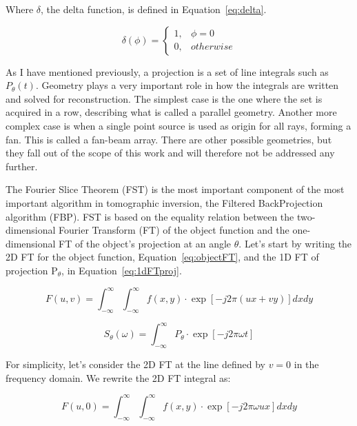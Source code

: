 Where $\delta$, the delta function, is defined in
Equation~\ref{eq:delta}.

\begin{equation}
    \label{eq:delta}
    \delta (\phi) =  
    \begin{cases}
            1, & \phi = 0\\
            0, & otherwise
    \end{cases}
\end{equation}

As I have mentioned previously, a projection is a set of line integrals
such as $P_{\theta}(t)$. Geometry plays a very important role in how the
integrals are written and solved for reconstruction. The simplest case
is the one where the set is acquired in a row, describing what is called
a parallel geometry. Another more complex case is when a single point
source is used as origin for all rays, forming a fan. This is called a
fan-beam array. There are other possible geometries, but they fall out of
the scope of this work and will therefore not be addressed any further.

The Fourier Slice Theorem (\gls{FST}) is the most important component of
the most important algorithm in tomographic inversion, the Filtered
BackProjection algorithm (\gls{FBP}). \gls{FST} is based on the equality
relation between the 
two-dimensional Fourier Transform (\gls{FT}) of the object function and
the one-dimensional \gls{FT} of the object's projection at an angle
$\theta$. Let's start by writing the 2D \gls{FT} for the object
function, Equation~\ref{eq:objectFT}, and the 1D \gls{FT} of projection
P$_\theta$, in Equation~\ref{eq:1dFTproj}.

\begin{equation}
    \label{eq:objectFT}
    F(u, v) = \int_{-\infty}^{\infty} \int_{-\infty}^{\infty} f(x, y)
    \cdot \exp \left [ -j2\pi (ux + vy) \right ] dx dy 
\end{equation}

\begin{equation}
    \label{eq:1dFTproj}
    S_{\theta}(\omega) = \int_{-\infty}^{\infty} P_{\theta} \cdot \exp\left[
    -j2 \pi \omega t \right]
\end{equation}

For simplicity, let's consider the 2D \gls{FT} at the line defined by
$v=0$ in the frequency domain. We rewrite the 2D \gls{FT} integral as:

\begin{equation}
    \label{eq:v0}
    F(u, 0) = \int_{-\infty}^{\infty} \int_{-\infty}^{\infty} f(x, y)
    \cdot \exp \left[  -j 2\pi  \omega ux \right] dx dy
\end{equation}

